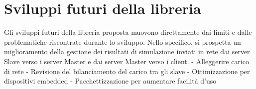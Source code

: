 \section{Sviluppi futuri della libreria}
Gli sviluppi futuri della libreria proposta muovono direttamente dai limiti e dalle problematiche riscontrate durante lo sviluppo.
Nello specifico, si prospetta un miglioramento della gestione dei risultati di simulazione inviati in rete dai server Slave verso i server Master e dai server Master verso i client.
- Alleggerire carico di rete
- Revisione del bilanciamento del carico tra gli slave
- Ottimizzazione per dispositivi embedded
- Pacchettizzazione per aumentare facilità d'uso